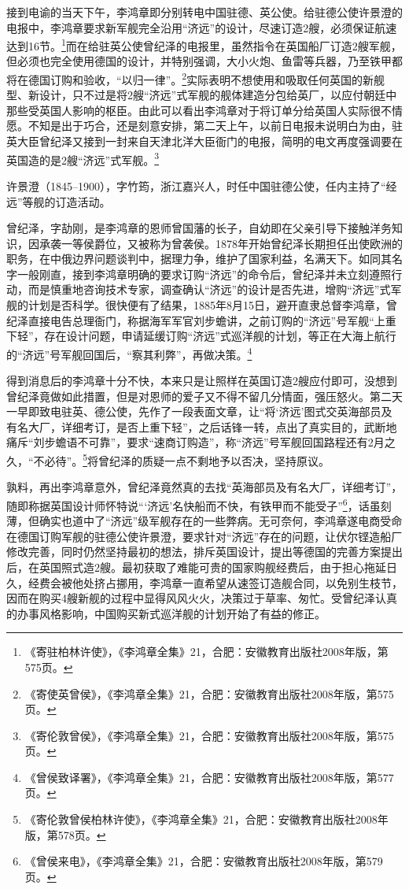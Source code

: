 \documentclass[12pt,UTF8]{ctexbook}
\begin{document}
接到电谕的当天下午，李鸿章即分别转电中国驻德、英公使。给驻德公使许景澄的电报中，李鸿章要求新军舰完全沿用“济远”的设计，尽速订造2艘，必须保证航速达到16节。\footnote{《寄驻柏林许使》，《李鸿章全集》21，合肥：安徽教育出版社2008年版，第575页。}而在给驻英公使曾纪泽的电报里，虽然指令在英国船厂订造2艘军舰，但必须也完全使用德国的设计，并特别强调，大小火炮、鱼雷等兵器，乃至铁甲都将在德国订购和验收，“以归一律”。\footnote{《寄使英曾侯》，《李鸿章全集》21，合肥：安徽教育出版社2008年版，第575页。}实际表明不想使用和吸取任何英国的新舰型、新设计，只不过是将2艘“济远”式军舰的舰体建造分包给英厂，以应付朝廷中那些受英国人影响的枢臣。由此可以看出李鸿章对于将订单分给英国人实际很不情愿。不知是出于巧合，还是刻意安排，第二天上午，以前日电报未说明白为由，驻英大臣曾纪泽又接到一封来自天津北洋大臣衙门的电报，简明的电文再度强调要在英国造的是2艘“济远”式军舰。\footnote{《寄伦敦曾侯》，《李鸿章全集》21，合肥：安徽教育出版社2008年版，第575页。}

许景澄（1845--1900），字竹筠，浙江嘉兴人，时任中国驻德公使，任内主持了“经远”等舰的订造活动。

曾纪泽，字劼刚，是李鸿章的恩师曾国藩的长子，自幼即在父亲引导下接触洋务知识，因承袭一等侯爵位，又被称为曾袭侯。1878年开始曾纪泽长期担任出使欧洲的职务，在中俄边界问题谈判中，据理力争，维护了国家利益，名满天下。如同其名字一般刚直，接到李鸿章明确的要求订购“济远”的命令后，曾纪泽并未立刻遵照行动，而是慎重地咨询技术专家，调查确认“济远”的设计是否先进，增购“济远”式军舰的计划是否科学。很快便有了结果，1885年8月15日，避开直隶总督李鸿章，曾纪泽直接电告总理衙门，称据海军军官刘步蟾讲，之前订购的“济远”号军舰“上重下轻”，存在设计问题，申请延缓订购“济远”式巡洋舰的计划，等正在大海上航行的“济远”号军舰回国后，“察其利弊”，再做决策。\footnote{《曾侯致译署》，《李鸿章全集》21，合肥：安徽教育出版社2008年版，第577页。}

得到消息后的李鸿章十分不快，本来只是让照样在英国订造2艘应付即可，没想到曾纪泽竟做如此措置，但是对恩师的爱子又不得不留几分情面，强压怒火。第二天一早即致电驻英、德公使，先作了一段表面文章，让“将‘济远’图式交英海部员及有名大厂，详细考订，是否上重下轻”，之后话锋一转，点出了真实目的，武断地痛斥“刘步蟾语不可靠”，要求“速商订购造”，称“济远”号军舰回国路程还有2月之久，“不必待”。\footnote{《寄伦敦曾侯柏林许使》，《李鸿章全集》21，合肥：安徽教育出版社2008年版，第578页。}将曾纪泽的质疑一点不剩地予以否决，坚持原议。

孰料，再出李鸿章意外，曾纪泽竟然真的去找“英海部员及有名大厂，详细考订”，随即称据英国设计师怀特说“‘济远’名快船而不快，有铁甲而不能受子”\footnote{《曾侯来电》，《李鸿章全集》21，合肥：安徽教育出版社2008年版，第579页。}，话虽刻薄，但确实也道中了“济远”级军舰存在的一些弊病。无可奈何，李鸿章遂电商受命在德国订购军舰的驻德公使许景澄，要求针对“济远”存在的问题，让伏尔铿造船厂修改完善，同时仍然坚持最初的想法，排斥英国设计，提出等德国的完善方案提出后，在英国照式造2艘。最初获取了难能可贵的国家购舰经费后，由于担心拖延日久，经费会被他处挤占挪用，李鸿章一直希望从速签订造舰合同，以免别生枝节，因而在购买4艘新舰的过程中显得风风火火，决策过于草率、匆忙。受曾纪泽认真的办事风格影响，中国购买新式巡洋舰的计划开始了有益的修正。
\end{document}
